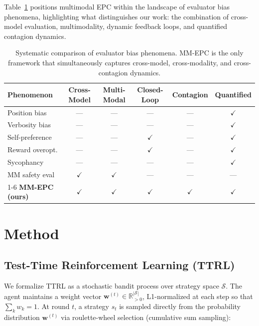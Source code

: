 \documentclass[11pt,a4paper]{article}
\begin{document}
Table~\ref{tab:related} positions multimodal EPC within the landscape of evaluator bias phenomena, highlighting what distinguishes our work: the combination of cross-model evaluation, multimodality, dynamic feedback loops, and quantified contagion dynamics.

\begin{table}[H]
\centering
\caption{Systematic comparison of evaluator bias phenomena. MM-EPC is the only framework that simultaneously captures cross-model, cross-modality, and cross-contagion dynamics.}
\label{tab:related}
\begin{tabular}{lccccc}
\toprule
\textbf{Phenomenon} & \textbf{Cross-Model} & \textbf{Multi-Modal} & \textbf{Closed-Loop} & \textbf{Contagion} & \textbf{Quantified} \\
\midrule
Position bias \cite{zheng2023judging}      & --- & --- & --- & --- & $\checkmark$ \\
Verbosity bias \cite{li2024alpacaeval}     & --- & --- & --- & --- & $\checkmark$ \\
Self-preference \cite{yuan2024selfrewarding} & --- & --- & $\checkmark$ & --- & $\checkmark$ \\
Reward overopt. \cite{gao2023reward}       & --- & --- & $\checkmark$ & --- & $\checkmark$ \\
Sycophancy \cite{sharma2024sycophancy}     & --- & --- & --- & --- & $\checkmark$ \\
MM safety eval \cite{openai2024gpt4o}      & $\checkmark$ & $\checkmark$ & --- & --- & --- \\
\cmidrule{1-6}
\textbf{MM-EPC (ours)} & $\checkmark$ & $\checkmark$ & $\checkmark$ & $\checkmark$ & $\checkmark$ \\
\bottomrule
\end{tabular}
\end{table}

\section{Method}

\subsection{Test-Time Reinforcement Learning (TTRL)}

We formalize TTRL as a stochastic bandit process over strategy space $\mathcal{S}$. The agent maintains a weight vector $\mathbf{w}^{(t)} \in \mathbb{R}^{|\mathcal{S}|}_{>0}$, L1-normalized at each step so that $\sum_k w_k = 1$. At round $t$, a strategy $s_t$ is sampled directly from the probability distribution $\mathbf{w}^{(t)}$ via roulette-wheel selection (cumulative sum sampling):
\end{document}

